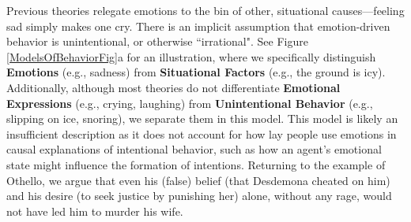 \documentclass[10pt,letterpaper]{article}
\begin{document}

Previous theories relegate emotions to the bin of other, situational causes---feeling sad simply makes one cry.
There is an implicit assumption that emotion-driven behavior is unintentional, or otherwise ``irrational". 
See Figure \ref{ModelsOfBehaviorFig}a for an illustration, where we specifically distinguish \textbf{Emotions} (e.g., sadness) from \textbf{Situational Factors} (e.g., the ground is icy). 
Additionally, although most theories do not differentiate \textbf{Emotional Expressions} (e.g., crying, laughing) from \textbf{Unintentional Behavior} (e.g., slipping on ice, snoring), we separate them in this model. 
This model is likely an insufficient description as it does not account for how lay people use emotions in causal explanations of intentional behavior, such as how an agent's emotional state might influence the formation of intentions. Returning to the example of Othello, we argue that even his (false) belief (that Desdemona cheated on him) and his desire (to seek justice by punishing her) alone, without any rage, would not have led him to murder his wife. 
\end{document}
